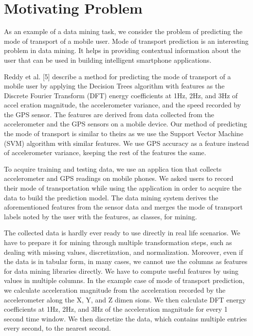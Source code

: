 \section{Motivating Problem}

As an example of a data mining task, we consider the problem of predicting the mode of transport of a mobile user. Mode of transport prediction is an interesting problem in data mining. It helps in providing contextual information about the user that can be used in building intelligent smartphone applications.

Reddy et al. [5] describe a method for predicting the mode of transport of a mobile user by applying the Decision Trees algorithm with features as the Discrete Fourier Transform (DFT) energy coefficients at 1Hz, 2Hz, and 3Hz of accel eration magnitude, the accelerometer variance, and the speed recorded by the GPS sensor. The features are derived from data collected from the accelerometer and the GPS sensors on a mobile device. Our method of predicting the mode of transport is similar to theirs as we use the Support Vector Machine (SVM) algorithm with similar features. We use GPS accuracy as a feature instead of accelerometer variance, keeping the rest of the features the same.

To acquire training and testing data, we use an applica tion that collects accelerometer and GPS readings on mobile phones. We asked users to record their mode of transportation while using the application in order to acquire the data to build the prediction model. The data mining system derives the aforementioned features from the sensor data and merges the mode of transport labels noted by the user with the features, as classes, for mining.

The collected data is hardly ever ready to use directly in real life scenarios. We have to prepare it for mining through multiple transformation steps, such as dealing with missing values, discretization, and normalization. Moreover, even if the data is in tabular form, in many cases, we cannot use the columns as features for data mining libraries directly. We have to compute useful features by using values in multiple columns. In the example case of mode of transport prediction, we calculate acceleration magnitude from the acceleration recorded by the accelerometer along the X, Y, and Z dimen sions. We then calculate DFT energy coefficients at 1Hz, 2Hz, and 3Hz of the acceleration magnitude for every 1 second time window. We then discretize the data, which contains multiple entries every second, to the nearest second. 

